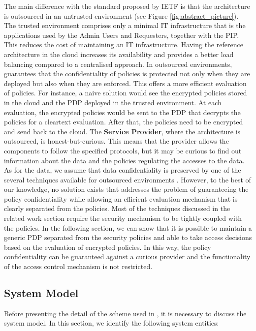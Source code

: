 \documentclass[final,5p,times,twocolumn]{elsarticle}
\begin{document}
The main difference with the standard proposed by IETF is that the  architecture is outsourced in an untrusted environment (see Figure \ref{fig:abstract_picture}). The trusted environment comprises only a minimal IT infrastructure that is the applications used by the Admin Users and Requesters, together with the PIP. This reduces the cost of maintaining an IT infrastructure. Having the reference architecture in the cloud increases its availability and provides a better load balancing compared to a centralised approach. In outsourced environments,  guarantees that the confidentiality of policies is protected not only when they are deployed but also when they are enforced. This offers a more efficient evaluation of policies. For instance, a naive solution would see the encrypted policies stored in the cloud and the PDP deployed in the trusted environment. At each evaluation, the encrypted policies would be sent to the PDP that decrypts the policies for a cleartext evaluation. After that, the policies need to be encrypted and send back to the cloud. The \textbf{Service Provider}, where the architecture is outsourced, is honest-but-curious. This means that the provider allows the  components to follow the specified protocols, but it may be curious to find out information about the data and the policies regulating the accesses to the data. As for the data, we assume that data confidentiality is preserved by one of the several techniques available for outsourced environments \cite{Dong2011, Rhee2010, Shao2010}. However, to the best of our knowledge, no solution exists that addresses the problem of guaranteeing the policy confidentiality while allowing an efficient evaluation mechanism that is clearly separated from the policies. Most of the techniques discussed in the related work section require the security mechanism to be tightly coupled with the policies. In the following section, we can show that it is possible to maintain a generic PDP separated from the security policies and able to take access decisions based on the evaluation of encrypted policies. In this way, the policy confidentiality can be guaranteed against a curious provider and the functionality of the access control mechanism is not restricted.


\subsection{System Model}
Before presenting the detail of the scheme used in , it is necessary to discuss the system model. In this section, we identify the following system entities:
\end{document}
